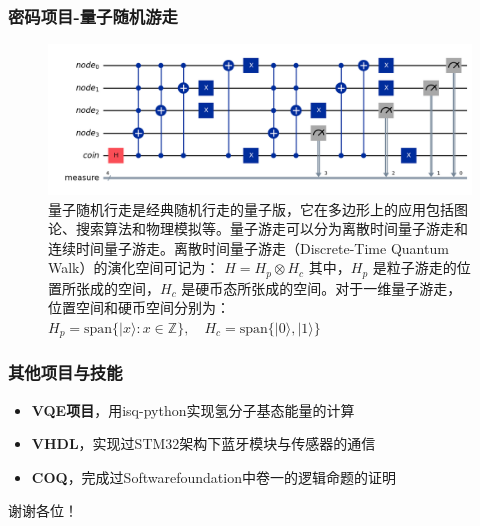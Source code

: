 \documentclass[aspectratio=1610]{beamer}
\begin{document}
\begin{frame}
    \frametitle{密码项目-量子随机游走}
    \begin{figure}[htbp]
        \includegraphics[width=.8\textwidth]{qw.png}
        \caption{量子随机行走是经典随机行走的量子版，它在多边形上的应用包括图论、搜索算法和物理模拟等。量子游走可以分为离散时间量子游走和连续时间量子游走。离散时间量子游走（Discrete-Time Quantum Walk）的演化空间可记为：
        \(
        H = H_p \otimes H_c
        \)
        其中，\( H_p \) 是粒子游走的位置所张成的空间，\( H_c \) 是硬币态所张成的空间。对于一维量子游走，位置空间和硬币空间分别为：
        \(
        H_p = \text{span}\{ |x\rangle : x \in \mathbb{Z} \}, \quad H_c = \text{span}\{ |0\rangle, |1\rangle \}
        \)}
    \end{figure}
\end{frame}


\begin{frame}
\frametitle{其他项目与技能}
\begin{itemize}
    \setlength{\itemsep}{20pt}
    \item \textbf{VQE项目}，用isq-python实现氢分子基态能量的计算
    \item \textbf{VHDL}，实现过STM32架构下蓝牙模块与传感器的通信
    \item \textbf{COQ}，完成过Softwarefoundation中卷一的逻辑命题的证明
\end{itemize}
\end{frame}

\begin{frame}
\begin{center}
    \huge
    谢谢各位！
\end{center}
\end{frame}
\end{document}
